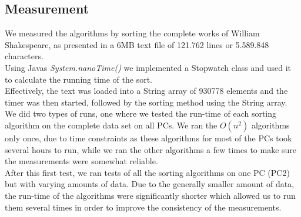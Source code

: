 \vspace{0.5cm}
\subsection{Measurement}
\label{sec:2.2}
We measured the algorithms by sorting the complete works of William Shakespeare, as presented in a 6MB text file of 121.762 lines or 5.589.848 characters.\\
Using Javas \emph{System.nanoTime()} we implemented a Stopwatch class and used it to calculate the running time of the sort. \cite{mal3}\\
Effectively, the text was loaded into a String array of 930778 elements and the timer was then started, followed by the sorting method using the String array.\\
We did two types of runs, one where we tested the run-time of each sorting algorithm on the complete data set on all PCs. We ran the \(O(n^2)\) algorithms only once, due to time constraints as these algorithms for most of the PCs took several hours to run, while we ran the other algorithms a few times to make sure the measurements were somewhat reliable.\\
After this first test, we ran tests of all the sorting algorithms on one PC (PC2) but with varying amounts of data. Due to the generally smaller amount of data, the run-time of the algorithms were significantly shorter which allowed us to run them several times in order to improve the consistency of the measurements. 






